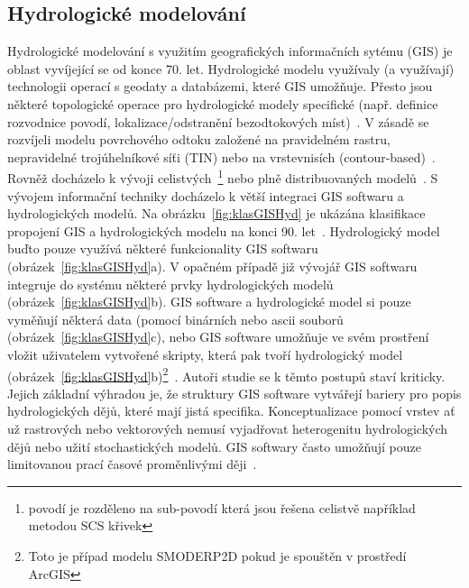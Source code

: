\subsection*{Hydrologické modelování}
Hydrologické modelování s využitím geografických informačních sytému (GIS) je oblast vyvíjející se od konce 70. let. Hydrologické modelu využívaly (a využívají) technologii operací s geodaty a databázemi, které GIS umožňuje. Přesto jsou některé topologické operace pro hydrologické modely specifické (např. definice rozvodnice povodí, lokalizace/odstranění bezodtokových míst)~\citep{devantier1993}. V zásadě se rozvíjeli modelu povrchového odtoku založené na pravidelném rastru, nepravidelné trojúhelníkové síťi (TIN) nebo na vrstevnisích (contour-based)~\citep{devantier1993}. Rovněž docházelo k vývoji celistvých~\footnote{povodí je rozděleno na sub-povodí která jsou řešena celistvě například metodou SCS křivek} nebo plně distribuovaných modelů~\citep{devantier1993}. S vývojem informační techniky docházelo k větší integraci GIS softwaru a hydrologických modelů. Na obrázku~\ref{fig:klasGISHyd} je ukázána klasifikace propojení GIS a hydrologických modelu na konci 90. let~\citep{sui1999}. Hydrologický model buďto pouze využívá některé funkcionality GIS softwaru (obrázek~\ref{fig:klasGISHyd}a). V opačném případě již vývojář GIS softwaru integruje do systému některé prvky hydrologických modelů (obrázek~\ref{fig:klasGISHyd}b). GIS software a hydrologické model si pouze vyměňují některá data (pomocí binárních nebo ascii souborů (obrázek~\ref{fig:klasGISHyd}c), nebo GIS software umožňuje ve svém prostření vložit uživatelem vytvořené skripty, která pak tvoří hydrologický model (obrázek~\ref{fig:klasGISHyd}b)\footnote{Toto je případ modelu SMODERP2D pokud je spouštěn v prostředí ArcGIS}~\citep{sui1999}. Autoři studie se k těmto postupů staví kriticky. Jejich základní výhradou je, že struktury GIS software vytvářejí bariery pro popis hydrologických dějů, které mají jistá specifika. Konceptualizace pomocí vrstev ať už rastrových  nebo vektorových nemusí vyjadřovat heterogenitu hydrologických dějů nebo užití stochastických modelů. GIS softwary často umožňují pouze limitovanou prací časové proměnlivými ději~\citep{sui1999}.

